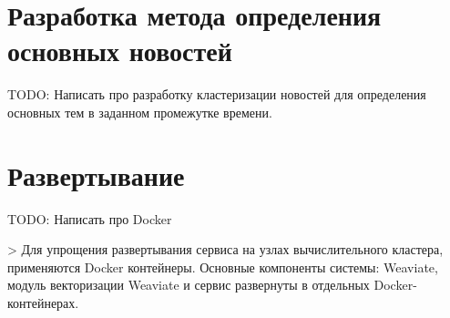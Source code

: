 \section{Разработка метода определения основных новостей}

TODO: Написать про разработку кластеризации новостей для определения основных тем в заданном промежутке времени.


\section{Развертывание}

TODO: Написать про Docker


> Для упрощения развертывания сервиса на узлах вычислительного кластера, применяются Docker контейнеры. Основные компоненты системы: Weaviate, модуль векторизации Weaviate и сервис развернуты в отдельных Docker-контейнерах.
